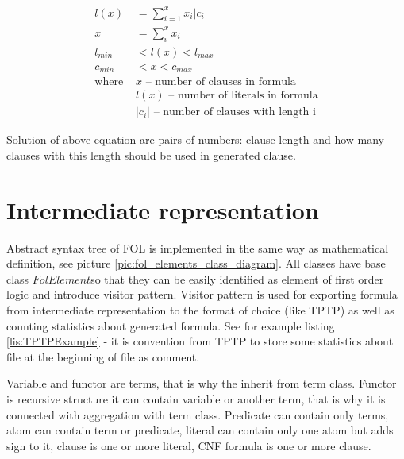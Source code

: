 \begin{align}
	l(x) &= \sum_{i=1}^{x} x_i |c_i| \\
	x &= \sum_i^x x_i \\
	l_{min} &< l(x) < l_{max} \\
	c_{min} &< x < c_{max} \\
	\text{where } 
		&x \text{ -- number of clauses in formula} \nonumber \\
		&l(x) \text{ -- number of literals in formula} \nonumber  \\
		&|c_i| \text{ -- number of clauses with length i} \nonumber
\end{align}

Solution of above equation are pairs of numbers: clause length and how many clauses with this length should be used in generated clause.

\section{Intermediate representation}

Abstract syntax tree of \gls{FOL} is implemented in the same way as mathematical definition, see picture \ref{pic:fol_elements_class_diagram}. All classes have base class $FolElement$so that they can be easily identified as element of first order logic and introduce visitor pattern. Visitor pattern is used for exporting formula from intermediate representation to the format of choice (like \gls{TPTP}) as well as counting statistics about generated formula. See for example listing \ref{lis:TPTPExample} - it is convention from TPTP to store some statistics about file at the beginning of file as comment.

Variable and functor are terms, that is why the inherit from term class. Functor is recursive structure it can contain variable or another term, that is why it is connected with aggregation with term class. Predicate can contain only terms, atom can contain term or predicate, literal can contain only one atom but adds sign to it, clause is one or more literal, CNF formula is one or more clause.


